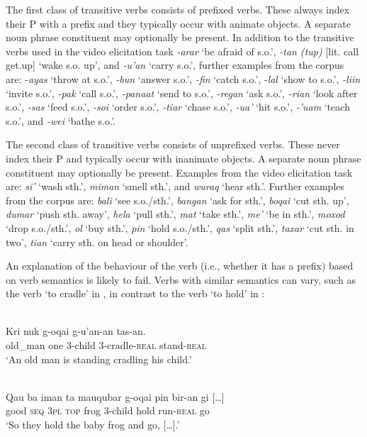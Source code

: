 The first class of transitive verbs consists of prefixed verbs. These always index their P with a prefix and they typically occur with animate objects. A separate noun phrase constituent may optionally be present. In addition to the transitive verbs used in the video elicitation task \textit{{}-arar} `be afraid of s.o.', \textit{{}-tan (tup)} [lit. call get.up] `wake s.o. up', and \textit{{}-u'an} `carry s.o.', further examples from the corpus are: -\textit{ayas} `throw at s.o.', \textit{{}-bun} `answer s.o.', \textit{{}-fin} `catch s.o.', -\textit{lal} `show to s.o.', \textit{{}-liin} `invite s.o.', \textit{{}-pak} `call s.o.', \textit{{}-panaat} `send to s.o.', \textit{{}-regan} `ask s.o.', \textit{{}-rian} `look after s.o.', \textit{{}-sas} `feed s.o.', \textit{{}-soi} `order s.o.', \textit{{}-tiar} `chase s.o.', \textit{{}-ua'} `hit s.o.', \textit{{}-'uam} `teach s.o.', and \textit{{}-wei} `bathe s.o.'. 

The second class of transitive verbs consists of unprefixed verbs. These never index their P and typically occur with inanimate objects. A separate noun phrase constituent may optionally be present. Examples from the video elicitation task are: \textit{si'} `wash sth.', \textit{miman} `smell sth.', and \textit{wuraq} `hear sth.'. Further examples from the corpus are: \textit{bali} `see s.o./sth.', \textit{bangan} `ask for sth.', \textit{boqai} `cut sth. up', \textit{dumar} `push sth. away', \textit{hela} `pull sth.', \textit{mat} `take sth.', \textit{me'} `be in sth.', \textit{moxod} `drop s.o./sth.', \textit{ol} `buy sth.', \textit{pin} `hold s.o./sth.', \textit{qas} `split sth.', \textit{taxar} `cut sth. in two', \textit{tian} `carry sth. on head or shoulder'.

An explanation of the behaviour of the verb (i.e., whether it has a prefix) based on verb semantics is likely to fail. Verbs with similar semantics can vary, such as the verb `to cradle' in , in contrast to the verb `to hold' in :


\ea 
\label{ex:10:1244}
 \\ 
 \gll    Kri  nuk  g-oqai  g-u'an-an  tas-an.\\
  old\_man  one  3-child  3-cradle-\textsc{real} stand-\textsc{real}  \\
 \glt `An old man is standing cradling his child.'
\z
 
\ea 
\label{ex:10:1245}
 \\ 
 \gll   Qau  ba  iman  ta    mauqubar  g-oqai  pin  bir-an  gi  [{\dots}] \\
    good  \textsc{seq}  \textsc{3pl}  \textsc{top}  frog  3-child  hold  run-\textsc{real}  go \\
 \glt  `So they hold the baby frog and go, [{\dots}].' 
\z

